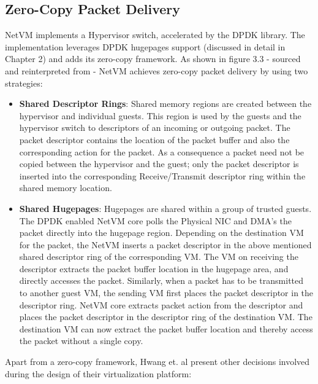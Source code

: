 \subsection*{Zero-Copy Packet Delivery}
NetVM implements a Hypervisor switch, accelerated by the DPDK library. The implementation leverages DPDK hugepages support (discussed in detail in Chapter 2) and adds its zero-copy framework. As shown in figure 3.3 - sourced and reinterpreted from\cite{hwang2015netvm} - NetVM achieves zero-copy packet delivery by using two strategies: 
\begin{itemize}

\item \textbf{Shared Descriptor Rings}: Shared memory regions are created between the hypervisor and individual guests. This region is used by the guests and the hypervisor switch to descriptors of an incoming or outgoing packet. The packet descriptor contains the location of the packet buffer and also the corresponding action for the packet. As a consequence a packet need not be copied between the hypervisor and the guest; only the packet descriptor is inserted into the corresponding Receive/Transmit descriptor ring within the shared memory location.

\item \textbf{Shared Hugepages}: Hugepages are shared within a group of trusted guests. The DPDK enabled NetVM core polls the Physical NIC and DMA's the packet directly into the hugepage region. Depending on the destination VM for the packet, the NetVM inserts a packet descriptor in the above mentioned shared descriptor ring of the corresponding VM. The VM on receiving the descriptor extracts the packet buffer location in the hugepage area, and directly accesses the packet. Similarly, when a packet has to be transmitted to another guest VM, the sending VM first places the packet descriptor in the descriptor ring. NetVM core extracts packet action from the descriptor and places the packet descriptor in the descriptor ring of the destination VM. The destination VM can now extract the packet buffer location and thereby access the packet without a single copy.
\end{itemize}

Apart from a zero-copy framework, Hwang et. al present other decisions involved during the design of their virtualization platform:


